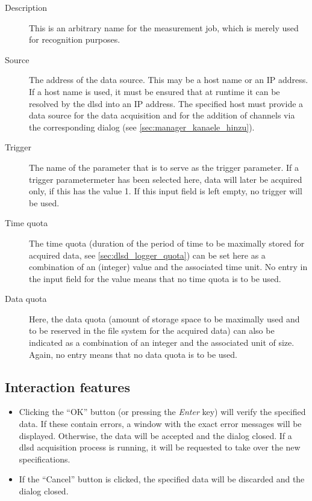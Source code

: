 \documentclass[a4paper,12pt,BCOR6mm,bibtotoc,idxtotoc]{scrbook}
\begin{document}
\begin{description}

\item[Description] This is an arbitrary name for the measurement job, which is
merely used for recognition purposes.

\item[Source] The address of the data source. This may be a host name or an IP
address. If a host name is used, it must be ensured that at runtime it can be
resolved by the dlsd into an IP address. The specified host must provide a
data source for the data acquisition and for the addition of channels via the
corresponding dialog (see \autoref{sec:manager_kanaele_hinzu}).

\item[Trigger] The name of the parameter that is to serve as the trigger
parameter. If a trigger parameter\-meter  has been selected here, data will
later be acquired only, if this has the value 1. If this input field is left
empty, no trigger will be used.

\item[Time quota] The time quota (duration of the period of time to be
maximally stored for acquired data, see \autoref{sec:dlsd_logger_quota}) can
be set here as a combination of an (integer) value and the associated time
unit. No entry in the input field for the value means that no time quota is to
be used.

\item[Data quota] Here, the data quota (amount of storage space to be
maximally used and to be reserved in the file system for the acquired data)
can also be indicated as a combination of an integer and the associated unit
of size. Again, no entry means that no data quota is to be used.

\end{description}


\subsection{Interaction features}

\begin{itemize}
\item Clicking the ``OK'' button (or pressing the \textit{Enter} key) will verify the specified data. If these contain errors, a window with the exact error messages will be displayed. Otherwise, the data will be accepted and the dialog closed. If a dlsd acquisition process is running, it will be requested to take over the new specifications.
\item If the ``Cancel'' button is clicked, the specified data will be discarded and the dialog closed. \end{itemize}
\end{document}
